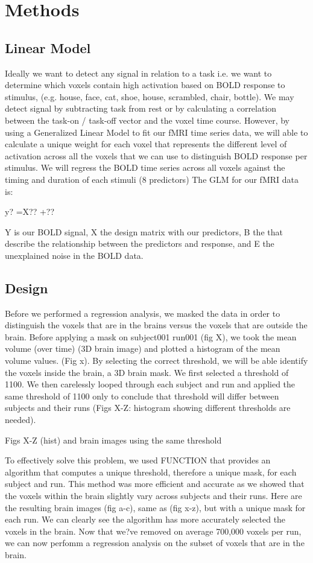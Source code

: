 \documentclass[11pt]{article}
\begin{document}
\section{Methods}

\subsection{Linear Model}
Ideally we want to detect any signal in relation to a task i.e. we want to 
determine which voxels contain high activation based on BOLD response to 
stimulus, (e.g. house, face, cat, shoe, house, scrambled, chair, bottle). We 
may detect signal by subtracting task from rest or by calculating a correlation 
between the task-on / task-off vector and the voxel time course. However, by 
using a Generalized Linear Model to fit our fMRI time series data, we will able 
to calculate a unique weight for each voxel that represents the different level 
of activation across all the voxels that we can use to distinguish BOLD 
response per stimulus.  We will regress the BOLD time series across all voxels 
against the timing and duration of each stimuli (8 predictors) The GLM for our 
fMRI data is:

y? =X?? +??

Y is our BOLD signal, X the design matrix with our predictors, B the that 
describe the relationship between the predictors and response, and E the 
unexplained noise in the BOLD data.

\subsection{Design}
Before we performed a regression analysis, we masked the data in order to 
distinguish the voxels that are in the brains versus the voxels that are 
outside the brain. Before applying a mask on subject001 run001 (fig X), we took 
the mean volume (over time) (3D brain image) and plotted a histogram of the 
mean volume values. (Fig x). By selecting the correct threshold, we will be 
able identify the voxels inside the brain, a 3D brain mask. We first selected a 
threshold of 1100. We then carelessly looped through each subject and run and 
applied the same threshold of 1100 only to conclude that threshold will differ 
between subjects and their runs (Figs X-Z: histogram showing different 
thresholds are needed). 

		Figs X-Z (hist) and brain images using the same threshold

To effectively solve this problem, we used FUNCTION that provides an algorithm 
that computes a unique threshold, therefore a unique mask, for each subject and 
run. This method was more efficient and accurate as we showed that the voxels 
within the brain slightly vary  across subjects and their runs. Here are the 
resulting brain images (fig a-c), same as (fig x-z), but with a unique mask for 
each run. We can clearly see the algorithm has  more accurately selected the 
voxels in the brain. Now that we?ve removed on average 700,000 voxels per run, 
we can now perfomm a regression analysis on the subset of voxels that are in 
the brain.    
          
\end{document}
